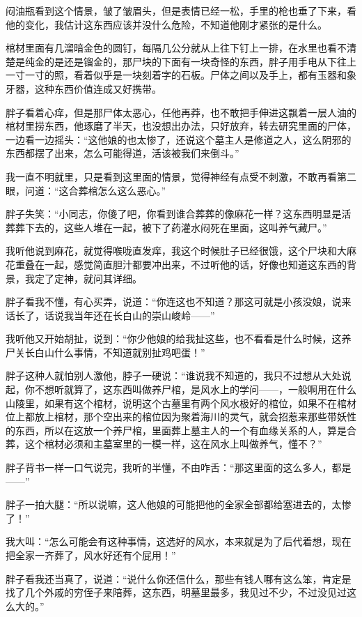 闷油瓶看到这个情景，皱了皱眉头，但是表情已经一松，手里的枪也垂了下来，看他的变化，我估计这东西应该并没什么危险，不知道他刚才紧张的是什么。

棺材里面有几溜暗金色的圆钉，每隔几公分就从上往下钉上一排，在水里也看不清楚是纯金的是还是镏金的，那尸块的下面有一块奇怪的东西，胖子用手电从下往上一寸一寸的照，看着似乎是一块刻着字的石板。尸体之间以及手上，都有玉器和象牙器，这种东西价值连成又好携带。

胖子看着心痒，但是那尸体太恶心，任他再莽，也不敢把手伸进这飘着一层人油的棺材里捞东西，他琢磨了半天，也没想出办法，只好放弃，转去研究里面的尸体，一边看一边摇头：“这他娘的也太惨了，还说这个墓主人是修道之人，这么阴邪的东西都摆了出来，怎么可能得道，活该被我们来倒斗。”

我一直不明就里，只是看到这里面的情景，觉得神经有点受不刺激，不敢再看第二眼，问道：“这合葬棺怎么这么恶心。”

胖子失笑：“小同志，你傻了吧，你看到谁合葬葬的像麻花一样？这东西明显是活葬葬下去的，这些人堆在一起，被下了药灌水闷死在里面，这叫养气藏尸。”

我听他说到麻花，就觉得喉咙直发痒，我这个时候肚子已经很饿，这个尸块和大麻花重叠在一起，感觉简直胆汁都要冲出来，不过听他的话，好像也知道这东西的背景，我定了定神，就问其详细。

胖子看我不懂，有心买弄，说道：“你连这也不知道？那这可就是小孩没娘，说来话长了，话说我当年还在长白山的崇山峻岭——”

我听他又开始胡扯，说到：“你少他娘的给我扯这些，也不看看是什么时候，这养尸关长白山什么事情，不知道就别扯鸡吧蛋！”

胖子这种人就怕别人激他，脖子一硬说：“谁说我不知道的，我只不过想从大处说起，你不想听就算了，这东西叫做养尸棺，是风水上的学问——，一般啊用在什么山陵里，如果有这个棺材，说明这个古墓里有两个风水极好的棺位，如果不在棺材位上都放上棺材，那个空出来的棺位因为聚着海川的灵气，就会招惹来那些带妖性的东西，所以在这放一个养尸棺，里面葬上墓主人的一个有血缘关系的人，算是合葬，这个棺材必须和主墓室里的一模一样，这在风水上叫做养气，懂不？”

胖子背书一样一口气说完，我听的半懂，不由咋舌：“那这里面的这么多人，都是——”

胖子一拍大腿：“所以说嘛，这人他娘的可能把他的全家全部都给塞进去的，太惨了！”

我大叫：“怎么可能会有这种事情，这选好的风水，本来就是为了后代着想，现在把全家一齐葬了，风水好还有个屁用！”

胖子看我还当真了，说道：“说什么你还信什么，那些有钱人哪有这么笨，肯定是找了几个外戚的穷侄子来陪葬，这东西，明墓里最多，我见过不少，不过没见过这么大的。”


